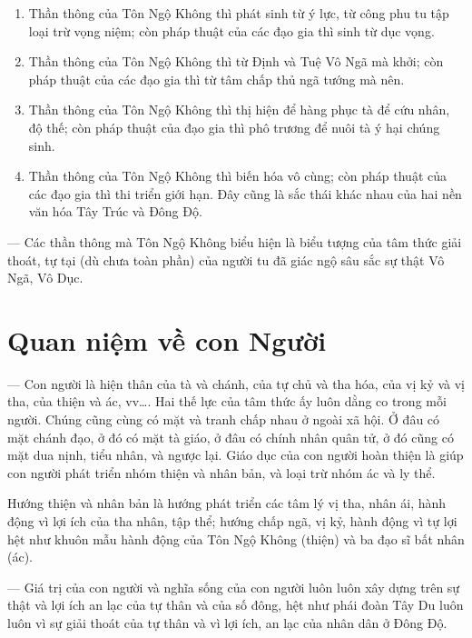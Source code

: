 \begin{enumerate}[label=\itshape\alph*\upshape/]
    \item Thần thông của Tôn Ngộ Không thì phát sinh từ ý lực, từ công phu tu tập loại trừ vọng niệm; còn pháp thuật của các đạo gia thì sinh từ dục vọng.

    \item Thần thông của Tôn Ngộ Không thì từ Định và Tuệ Vô Ngã mà khởi; còn pháp thuật của các đạo gia thì từ tâm chấp thủ ngã tướng mà nên.

    \item Thần thông của Tôn Ngộ Không thì thị hiện để hàng phục tà để cứu nhân, độ thế; còn pháp thuật của đạo gia thì phô trương để nuôi tà ý hại chúng sinh.

    \item Thần thông của Tôn Ngộ Không thì biến hóa vô cùng; còn pháp thuật của các đạo gia thì thi triển giới hạn. Đây cũng là sắc thái khác nhau của hai nền văn hóa Tây Trúc và Đông Độ.
\end{enumerate}

— Các thần thông mà Tôn Ngộ Không biểu hiện là biểu tượng của tâm thức giải thoát, tự tại (dù chưa toàn phần) của người tu đã giác ngộ sâu sắc sự thật Vô Ngã, Vô Dục.


\section{Quan niệm về con Người} %
\label{sec:44_45_con_nguoi}

— Con người là hiện thân của tà và chánh, của tự chủ và tha hóa, của vị kỷ và vị tha, của thiện và ác, vv\ldots. Hai thế lực của tâm thức ấy luôn dằng co trong mỗi người. Chúng cũng cùng có mặt và tranh chấp nhau ở ngoài xã hội. Ở đâu có mặt chánh đạo, ở đó có mặt tà giáo, ở đâu có chính nhân quân tử, ở đó cũng có mặt dua nịnh, tiểu nhân, và ngược lại. Giáo dục của con người hoàn thiện là giúp con người phát triển nhóm thiện và nhân bản, và loại trừ nhóm ác và ly thể.

Hướng thiện và nhân bản là hướng phát triển các tâm lý vị tha, nhân ái, hành động vì lợi ích của tha nhân, tập thể; hướng chấp ngã, vị kỷ, hành động vì tự lợi hệt như khuôn mẫu hành động của Tôn Ngộ Không (thiện) và ba đạo sĩ bất nhân (ác).

— Giá trị của con người và nghĩa sống của con người luôn luôn xây dựng trên sự thật và lợi ích an lạc của tự thân và của số đông, hệt như phái đoàn Tây Du luôn luôn vì sự giải thoát của tự thân và vì lợi ích, an lạc của nhân dân ở Đông Độ.


